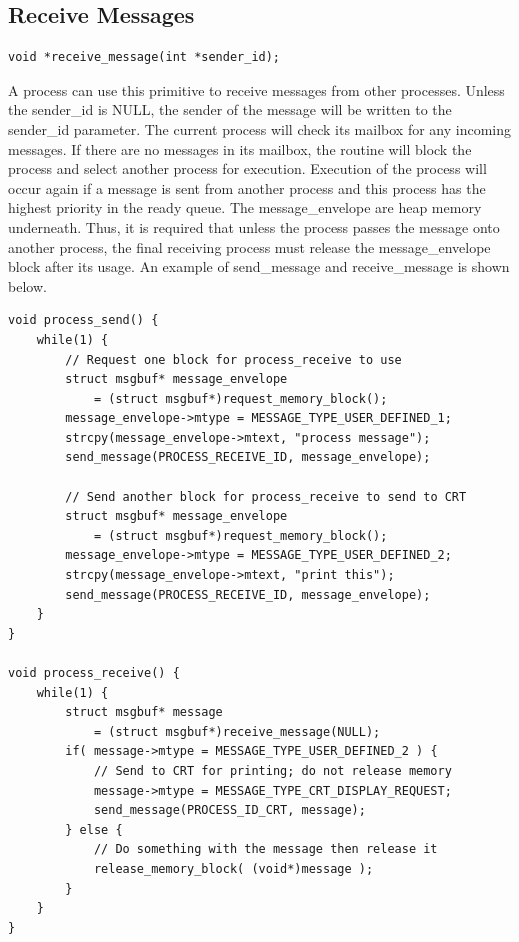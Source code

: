 \documentclass[12pt]{report}
\begin{document}
\subsection{Receive Messages}
\label{sec:receive_message}

\begin{lstlisting}
void *receive_message(int *sender_id);
\end{lstlisting}
\par A process can use this primitive to receive messages from other processes. Unless the sender\_id is NULL, the sender of the message will be written to the sender\_id parameter. The current process will check its mailbox for any incoming messages. If there are no messages in its mailbox, the routine will block the process and select another process for execution. Execution of the process will occur again if a message is sent from another process and this process has the highest priority in the ready queue. The message\_envelope are heap memory underneath. Thus, it is required that unless the process passes the message onto another process, the final receiving process must release the message\_envelope block after its usage. An example of send\_message and receive\_message is shown below.

\begin{lstlisting}
void process_send() {
    while(1) {
        // Request one block for process_receive to use
        struct msgbuf* message_envelope
            = (struct msgbuf*)request_memory_block();
        message_envelope->mtype = MESSAGE_TYPE_USER_DEFINED_1;
        strcpy(message_envelope->mtext, "process message");
        send_message(PROCESS_RECEIVE_ID, message_envelope);

        // Send another block for process_receive to send to CRT
        struct msgbuf* message_envelope
            = (struct msgbuf*)request_memory_block();
        message_envelope->mtype = MESSAGE_TYPE_USER_DEFINED_2;
        strcpy(message_envelope->mtext, "print this");
        send_message(PROCESS_RECEIVE_ID, message_envelope);
    }
}

void process_receive() {
    while(1) {
        struct msgbuf* message
            = (struct msgbuf*)receive_message(NULL);
        if( message->mtype = MESSAGE_TYPE_USER_DEFINED_2 ) {
            // Send to CRT for printing; do not release memory
            message->mtype = MESSAGE_TYPE_CRT_DISPLAY_REQUEST;
            send_message(PROCESS_ID_CRT, message);
        } else {
            // Do something with the message then release it
            release_memory_block( (void*)message );
        }
    }
}
\end{lstlisting}
\end{document}
